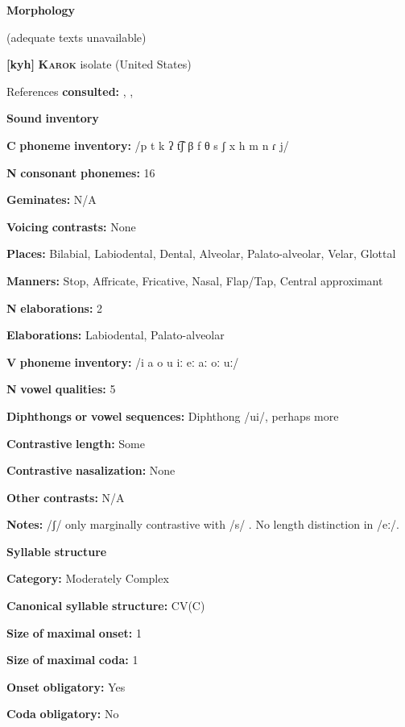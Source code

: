 \begin{styleBody}
\textbf{Morphology}

(adequate texts unavailable)

\textbf{[kyh]}   \textbf{\textsc{Karok}}  isolate (United States)

References \textbf{consulted:} \citet{AnguloFreeland1971}, \citet{Bright1957}, \citet{Sandy2014}

\textbf{Sound} \textbf{inventory}

\textbf{C} \textbf{phoneme} \textbf{inventory:} /p t k ʔ t͡ʃ β f θ s ʃ x h m n ɾ j/

\textbf{N} \textbf{consonant} \textbf{phonemes:} 16

\textbf{Geminates:} N/A

\textbf{Voicing} \textbf{contrasts:} None

\textbf{Places:} Bilabial, Labiodental, Dental, Alveolar, Palato-alveolar, Velar, Glottal

\textbf{Manners:} Stop, Affricate, Fricative, Nasal, Flap/Tap, Central approximant

\textbf{N} \textbf{elaborations:} 2

\textbf{Elaborations:} Labiodental, Palato-alveolar

\textbf{V} \textbf{phoneme} \textbf{inventory:} /i a o u iː eː aː oː uː/

\textbf{N} \textbf{vowel} \textbf{qualities:} 5

\textbf{Diphthongs} \textbf{or} \textbf{vowel} \textbf{sequences:} Diphthong /ui/, perhaps more

\textbf{Contrastive} \textbf{length:} Some

\textbf{Contrastive} \textbf{nasalization:} None

\textbf{Other} \textbf{contrasts:} N/A

\textbf{Notes:} /ʃ/ only marginally contrastive with /s/ \citep[17]{Bright1957}. No length distinction in /eː/.

\textbf{Syllable} \textbf{structure}

\textbf{Category:} Moderately Complex

\textbf{Canonical} \textbf{syllable} \textbf{structure:} CV(C) \citep[11]{Bright1957}

\textbf{Size} \textbf{of} \textbf{maximal} \textbf{onset:} 1

\textbf{Size} \textbf{of} \textbf{maximal} \textbf{coda:} 1

\textbf{Onset} \textbf{obligatory:} Yes

\textbf{Coda} \textbf{obligatory:} No


\end{styleBody}
